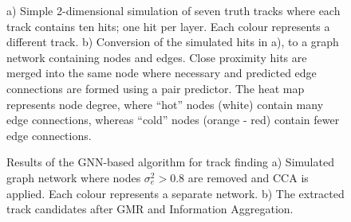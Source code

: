 \begin{center}
\begin{figure}[htbp]
    \caption{a) Simple 2-dimensional simulation of seven truth tracks where each track contains ten hits; one hit per layer. Each colour represents a different track. b)  Conversion of the simulated hits in a), to a graph network containing nodes and edges. Close proximity hits are merged into the same node where necessary and predicted edge connections are formed using a pair predictor. The heat map represents node degree, where ``hot'' nodes (white) contain many edge connections, whereas ``cold'' nodes (orange - red) contain fewer edge connections.}%
    \label{fig:setup}%
\end{figure}
\end{center}


\begin{center}
\begin{figure}[htbp]%
    \centering
    \hfill
    \caption{Results of the GNN-based algorithm for track finding a) Simulated graph network where nodes $\sigma_e^2 > 0.8$ are removed and CCA is applied. Each colour represents a separate network. b) The extracted track candidates after GMR and Information Aggregation.}%
    \label{fig:example-application-1}%
\end{figure}
\end{center}





